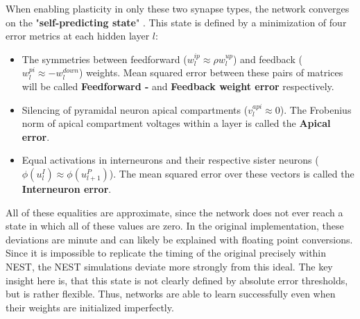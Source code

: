 When enabling plasticity in only these two synapse types, the network converges on the "\textbf{self-predicting state}"
\citep{sacramento2018dendritic}. This state is defined by a minimization of four error metrics at each hidden layer $l$:

\begin{itemize}
  \item The symmetries between feedforward ($w_l^{ip} \approx \rho w_l^{up}$) and feedback ($w_l^{pi} \approx
          -w_l^{down}$) weights. Mean squared error between these pairs of matrices will be called \textbf{Feedforward -
          } and \textbf{Feedback weight error} respectively.
  \item Silencing of pyramidal neuron apical compartments ($v_l^{api} \approx 0$). The Frobenius norm \citeme of apical
        compartment voltages within a layer is called the \textbf{Apical error}.
  \item Equal activations in interneurons and their respective sister neurons ($\phi (u_l^I) \approx \phi (u_{l+1}^P)$).
        The mean squared error over these vectors is called the \textbf{Interneuron error}.
\end{itemize}


All of these equalities are approximate, since the network does not ever reach a state in which all of these values are
zero. In the original implementation, these deviations are minute and can likely be explained with floating point
conversions. Since it is impossible to replicate the timing of the original precisely within NEST, the NEST simulations
deviate more strongly from this ideal. The key insight here is, that this state is not clearly defined by absolute error
thresholds, but is rather flexible. Thus, networks are able to learn successfully even when their weights are
initialized imperfectly. 

